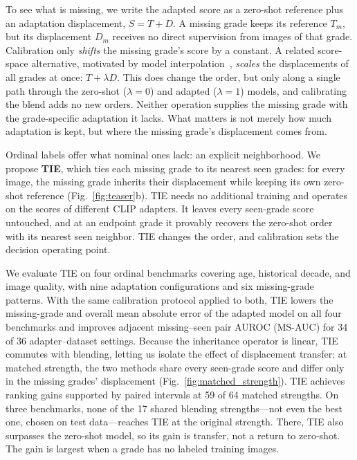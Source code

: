 To see what is missing, we write the adapted score as a zero-shot reference plus an adaptation displacement, $S=T+D$.
A missing grade keeps its reference $T_m$, but its displacement $D_m$ receives no direct supervision from images of that grade.
Calibration only \emph{shifts} the missing grade's score by a constant.
A related score-space alternative, motivated by model interpolation~\cite{wortsman2022robust}, \emph{scales} the displacements of all grades at once: $T+\lambda D$.
This does change the order, but only along a single path through the zero-shot ($\lambda{=}0$) and adapted ($\lambda{=}1$) models, and calibrating the blend adds no new orders.
Neither operation supplies the missing grade with the grade-specific adaptation it lacks.
What matters is not merely how much adaptation is kept, but where the missing grade's displacement comes from.

Ordinal labels offer what nominal ones lack: an explicit neighborhood.
We propose \textbf{TIE}, which ties each missing grade to its nearest seen grades: for every image, the missing grade inherits their displacement while keeping its own zero-shot reference (Fig.~\ref{fig:teaser}b).
TIE needs no additional training and operates on the scores of different CLIP adapters.
It leaves every seen-grade score untouched, and at an endpoint grade it provably recovers the zero-shot order with its nearest seen neighbor.
TIE changes the order, and calibration sets the decision operating point.

We evaluate TIE on four ordinal benchmarks covering age, historical decade, and image quality, with nine adaptation configurations and six missing-grade patterns.
With the same calibration protocol applied to both, TIE lowers the missing-grade and overall mean absolute error of the adapted model on all four benchmarks and improves adjacent missing--seen pair AUROC (MS-AUC) for 34 of 36 adapter--dataset settings.
Because the inheritance operator is linear, TIE commutes with blending, letting us isolate the effect of displacement transfer: at matched strength, the two methods share every seen-grade score and differ only in the missing grades' displacement (Fig.~\ref{fig:matched_strength}).
TIE achieves ranking gains supported by paired intervals at 59 of 64 matched strengths.
On three benchmarks, none of the 17 shared blending strengths---not even the best one, chosen on test data---reaches TIE at the original strength.
There, TIE also surpasses the zero-shot model, so its gain is transfer, not a return to zero-shot.
The gain is largest when a grade has no labeled training images.

